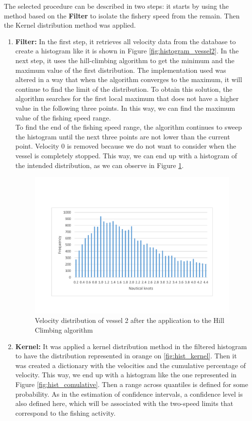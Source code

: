 The selected procedure can be described in two steps: it starts by using the method based on the \textbf{Filter} to isolate the fishery speed from the remain. Then the Kernel distribution method was applied.
\begin{enumerate}
\item \textbf{Filter:} In the first step, it retrieves all velocity data from the database to create a histogram like it is shown in Figure \ref{fig:histogram_vessel2}. In the next step, it uses the hill-climbing algorithm to get the minimum and the maximum value of the first distribution. 
The implementation used was altered in a way that when the algorithm converges to the maximum, it will continue to find the limit of the distribution.
To obtain this solution, the algorithm searches for the first local maximum that does not have a higher value in the following three points. In this way, we can find the maximum value of the fishing speed range. \\
To find the end of the fishing speed range, the algorithm continues to sweep the histogram until the next three points are not lower than the current point.
Velocity 0 is removed because we do not want to consider when the vessel is completely stopped. 
This way, we can end up with a histogram of the intended distribution, as we can observe in Figure \ref{fig:sog_hill_climbing}.

\begin{figure}[H]
\centering
\includegraphics[trim=0 50 0 50,width=0.8\linewidth]{Chapters/img/sog_hill_climbing.pdf}
\caption{Velocity distribution of vessel 2 after the application to the Hill Climbing algorithm}
\label{fig:sog_hill_climbing}
\end{figure}


\item \textbf{Kernel:} It was applied a kernel distribution method in the filtered histogram to have the distribution represented in orange on \ref{fig:hist_kernel}. Then it was created a dictionary with the velocities and the cumulative percentage of velocity. This way, we end up with a histogram like the one represented in Figure \ref{fig:hist_comulative}. 
Then a range across quantiles is defined for some probability. As in the estimation of confidence intervals, a confidence level is also defined here, which will be associated with the two-speed limits that correspond to the fishing activity.
\end{enumerate} 

